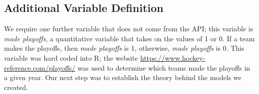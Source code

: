 \subsection*{Additional Variable Definition}
We require one further variable that does not come from the API; this variable is \textit{made playoffs}, a quantitative variable that takes on the values of 1 or 0. If a team makes the playoffs, then \textit{made playoffs} is 1, otherwise, \textit{made playoffs} is 0. This variable was hard coded into R; the website \url{https://www.hockey-reference.com/playoffs/} was used to determine which teams made the playoffs in a given year. Our next step was to establish the theory behind the models we created.


